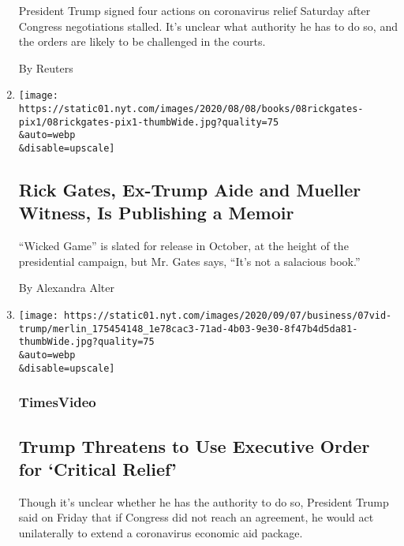 \begin{enumerate}
  President Trump signed four actions on coronavirus relief Saturday
  after Congress negotiations stalled. It's unclear what authority he
  has to do so, and the orders are likely to be challenged in the
  courts.

  By Reuters
\item
  \href{/2020/08/08/books/rick-gates-trump-mueller-wicked-game.html}{}

  \texttt{[image: https://static01.nyt.com/images/2020/08/08/books/08rickgates-pix1/08rickgates-pix1-thumbWide.jpg?quality=75\\\&auto=webp\\\&disable=upscale]}

  \hypertarget{rick-gates-ex-trump-aide-and-mueller-witness-is-publishing-a-memoir}{%
  \subsection{Rick Gates, Ex-Trump Aide and Mueller Witness, Is
  Publishing a
  Memoir}\label{rick-gates-ex-trump-aide-and-mueller-witness-is-publishing-a-memoir}}

  ``Wicked Game'' is slated for release in October, at the height of the
  presidential campaign, but Mr. Gates says, ``It's not a salacious
  book.''

  By Alexandra Alter
\item
  \href{/video/us/politics/100000007279339/trump-says-he-will-act-on-his-own-if-congress-doesnt-agree-on-relief.html}{}

  \texttt{[image: https://static01.nyt.com/images/2020/09/07/business/07vid-trump/merlin\_175454148\_1e78cac3-71ad-4b03-9e30-8f47b4d5da81-thumbWide.jpg?quality=75\\\&auto=webp\\\&disable=upscale]}

  \hypertarget{timesvideo-1}{%
  \subsubsection{TimesVideo}\label{timesvideo-1}}

  \hypertarget{trump-threatens-to-use-executive-order-for-critical-relief}{%
  \subsection{Trump Threatens to Use Executive Order for `Critical
  Relief'}\label{trump-threatens-to-use-executive-order-for-critical-relief}}

  Though it's unclear whether he has the authority to do so, President
  Trump said on Friday that if Congress did not reach an agreement, he
  would act unilaterally to extend a coronavirus economic aid package.


\end{enumerate}

